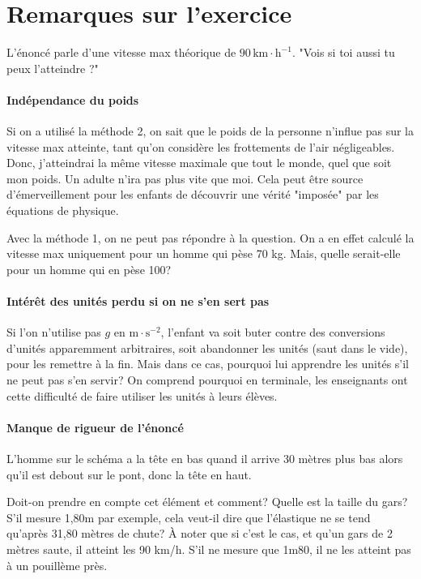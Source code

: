 \section{Remarques sur l'exercice}
L'énoncé parle d'une vitesse max théorique de $90\,\mathrm{km\cdot h^{-1}}$. "Vois si toi aussi tu peux l'atteindre ?"

\paragraph{Indépendance du poids}
Si on a utilisé la méthode 2, on sait que le poids de la personne n'influe pas sur la vitesse max atteinte, tant qu'on considère les frottements de l'air négligeables. Donc, j'atteindrai la même vitesse maximale que tout le monde, quel que soit mon poids. Un adulte n'ira pas plus vite que moi. Cela peut être source d'émerveillement pour les enfants de découvrir une vérité "imposée" par les équations de physique.

Avec la méthode 1, on ne peut pas répondre à la question. On a en effet calculé la vitesse max uniquement pour un homme qui pèse 70 kg. Mais, quelle serait-elle pour un homme qui en pèse 100?

\paragraph{Intérêt des unités perdu si on ne s'en sert pas}
Si l'on n'utilise pas $g$ en $\mathrm{m\cdot s^{-2}}$, l'enfant va soit buter contre des conversions d'unités apparemment arbitraires, soit abandonner les unités (saut dans le vide), pour les remettre à la fin. Mais dans ce cas, pourquoi lui apprendre les unités s'il ne peut pas s'en servir? On comprend pourquoi en terminale, les enseignants ont cette difficulté de faire utiliser les unités à leurs élèves.

\paragraph{Manque de rigueur de l'énoncé}
L'homme sur le schéma a la tête en bas quand il arrive 30 mètres plus bas alors qu'il est debout sur le pont, donc la tête en haut.

Doit-on prendre en compte cet élément et comment? Quelle est la taille du gars? S'il mesure 1,80m par exemple, cela veut-il dire que l'élastique ne se tend qu'après 31,80 mètres de chute? À noter que si c'est le cas, et qu'un gars de 2 mètres saute, il atteint les 90 km/h. S'il ne mesure que 1m80, il ne les atteint pas à un pouillème près.

